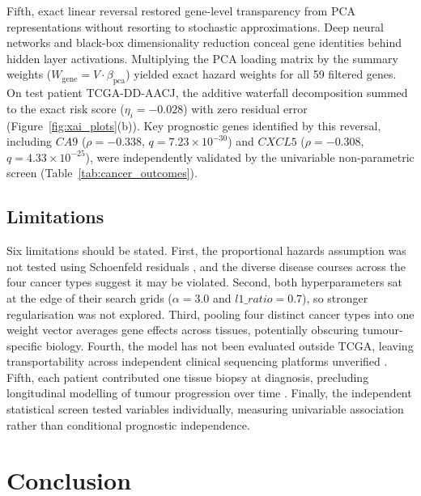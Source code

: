 \documentclass[10pt,a4paper]{article}
\begin{document}
Fifth, exact linear reversal restored gene-level transparency from PCA representations without resorting to stochastic approximations. Deep neural networks and black-box dimensionality reduction conceal gene identities behind hidden layer activations. Multiplying the PCA loading matrix by the summary weights ($W_{\text{gene}} = V \cdot \beta_{\text{pca}}$) yielded exact hazard weights for all 59 filtered genes. On test patient TCGA-DD-AACJ, the additive waterfall decomposition summed to the exact risk score ($\eta_i = -0.028$) with zero residual error (Figure~\ref{fig:xai_plots}(b)). Key prognostic genes identified by this reversal, including $CA9$ ($\rho = -0.338$, $q = 7.23 \times 10^{-30}$) and $CXCL5$ ($\rho = -0.308$, $q = 4.33 \times 10^{-25}$), were independently validated by the univariable non-parametric screen (Table~\ref{tab:cancer_outcomes}).

\subsection{Limitations}
\label{sec:limitations}

Six limitations should be stated. First, the proportional hazards assumption was not tested using Schoenfeld residuals \citep{schoenfeld1982partial}, and the diverse disease courses across the four cancer types suggest it may be violated. Second, both hyperparameters sat at the edge of their search grids ($\alpha = 3.0$ and $l1\_ratio = 0.7$), so stronger regularisation was not explored. Third, pooling four distinct cancer types into one weight vector averages gene effects across tissues, potentially obscuring tumour-specific biology. Fourth, the model has not been evaluated outside TCGA, leaving transportability across independent clinical sequencing platforms unverified \citep{poirion2021deepprog}. Fifth, each patient contributed one tissue biopsy at diagnosis, precluding longitudinal modelling of tumour progression over time \citep{lee2020dynamic}. Finally, the independent statistical screen tested variables individually, measuring univariable association rather than conditional prognostic independence.

\section{Conclusion}
\label{sec:conclusion}
\end{document}
